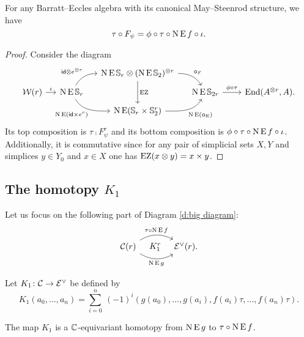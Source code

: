 \begin{lemma}\label{l:K0}
	For any Barratt--Eccles algebra with its canonical May--Steenrod structure, we have
	\[
	\tau \mathbin{\circ} F_\psi = \phi \mathbin{\circ} \tau \mathbin{\circ} \operatorname{N}\operatorname{E} f \mathbin{\circ} \iota.
	\]
\end{lemma}

\begin{proof}
	Consider the diagram
	\begin{equation*}\label{d:F and f}
		\begin{tikzcd}[column sep=small,row sep=tiny]
			&& \chains\EE\sym_r \ot (\chains\EE\sym_2)^{\ot r}
			\arrow[dr,"\bcomp_{\BE}",out=0,in=120]
			\arrow[dd,"\EZ"] &&[10pt] \\
			\cW(r) \arrow[r,"\iota"] &
			\chains\EE\sym_r
			\arrow[ur,"\id \ot e^{\ot r}", out=60,in=180]
			\arrow[dr,"\chains\EE(\id \times e^r)"',out=-60,in=180]
			& & \chains\EE\sym_{2r} \arrow[r,"\phi\comp\tau"] &
			\End(A^{\ot r}, A). \\
			&& \chains\EE(\sym_r \times \sym_2^r)
			\arrow[ur, "\chains\EE(\bcomp_{\EE})"', out=0,in=-120]
			&
		\end{tikzcd}
	\end{equation*}
	Its top composition is $\tau \comp F_\psi^r$ and its bottom composition is $\phi \mathbin{\circ} \tau \mathbin{\circ} \operatorname{N}\operatorname{E} f \mathbin{\circ} \iota$.
	Additionally, it is commutative since for any pair of simplicial sets $X,Y$ and simplices $y \in Y_0$ and $x \in X$ one has $\operatorname{EZ}(x \otimes y) = x \times y$.
\end{proof}

\subsection{The homotopy $K_1$}\label{ss:K1}

Let us focus on the following part of Diagram \eqref{d:big diagram}:
\[
\begin{tikzcd}[column sep=large]
	\cC(r)
	\arrow[r,bend left,"\tau \comp \chains\EE f"]
	\arrow[r,bend right,"\chains\EE g"']
	\arrow[r,phantom,"K_1^r"]
	& \BE^\vee(r).
\end{tikzcd}
\]

\begin{definition}
	Let $K_1 \colon \mathcal{C} \to \mathcal{E}^\vee$ be defined by
	\[
	K_1(a_0,\dots,a_n) =
	\sum_{i=0}^n \ (-1)^i (g(a_0), \dots, g(a_i), f(a_i) \tau, \dots, f(a_n) \tau).
	\]
\end{definition}

\begin{lemma}\label{l:K1}
	The map $K_1$ is a $\mathbb{C}$-equivariant homotopy from $\operatorname{N} \operatorname{E} g$ to $\tau \mathbin{\circ} \operatorname{N} \operatorname{E} f$.
\end{lemma}

